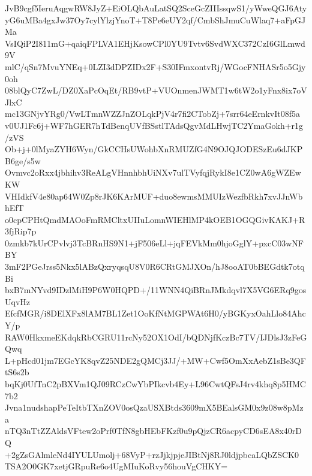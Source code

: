 JvB9cgf5IeruAqgwRW8JyZ+EiOLQbAuLatSQ2SceGcZIIIssqwS1/yWweQGJ6Aty
yG6uMBa4gxJw37Oy7cylYlzjYnoT+T8Pe6eUY2qf/CmbShJmuCuWlaq7+aFpGJMa
VsIQiP2I811mG+qaiqFPLVA1EHjKsowCPl0YU9Tvtv6SvdWXC372CzI6GlLmwd9V
mlC/qSn7MvuYNEq+0LZI3dDPZIDx2F+S30IFmxontvRj/WGocFNHASr5o5Gjy0oh
08blQyC7ZwL/DZ0XaPcOqEt/RB9vtP+VUOnmenJWMT1w6tW2o1yFnx8ix7oVJlxC
mc13GNjvYRg0/VwLTmnWZZJnZOLqkPjV4r7fi2CTobZj+7srr64eErnkvIt08f5a
v0UJ1Fc6j+WF7hGER7hTdBenqUVfBSstlTAdsQgvMdLHwjTC2YmaGokh+r1g/zVS
Ob+j+0lMyaZYH6Wyn/GkCCHsUWohbXnRMUZfG4N9OJQJODESzEu6dJKPB6ge/s5w
Ovmvc2oRxx4jbhihv3ReALgVHnnhbhUiNXv7ulTVyfqjRykI8e1CZ0wA6gWZEwKW
VHIdkfV4e80ap64W0Zp8rJK6KArMUF+duo8ewmsMMUIzWezfbRkh7xvJJnWbhEfT
o0cpCPHtQmdMAOoFmRMCltxUIIuLomnWIEHlMP4kOEB1OGQGivKAKJ+R3fjRip7p
0zmkb7kUrCPvlvj3TcBRnHS9N1+jF506eLl+jqFEVkMm0hjoGglY+pxcC03wNFBY
3mF2PGeJrss5Nkx5lABzQxryqsqU8V0R6CRtGMJXOn/hJ8ooAT0bBEGdtk7otqBi
bxB7mNYvd9IDzlMiH9P6W0HQPD+/11WNN4QiBRnJMkdqvl7X5VG6ERq9gosUqvHz
EfcfMGR/i8DElXFx8lAM7BL1Zet1OoKfNtMGPWAt6H0/yBGKyxOahLlo84AhcY/p
RAW0HkxmeEKdqkRbCGRU11rcNy52OX1OdI/bQDNjfKczBc7TV/IJDlsJ3zFeGQwq
L+pHcd01jm7EGcYK8qvZ25NDE2gQMCj3JJ/+MW+Cwf5OmXxAebZ1sBe3QFtS6s2b
bqKj0UfTnC2pBXVm1QJ09RCzCwYbPIkcvb4Ey+L96CwtQFsJ4rv4khq8p5HMC7b2
Jvna1nudshapPeTeItbTXnZOV0osQzaUSXBtds3609mX5BEalsGM0x9z08w8pMza
nTQ3nTtZZAldsVFtew2oPrf0TfN8gbHEbFKzf0u9pQjzCR6acpyCD6sEA8x40rDQ
+2gZsGAlmleNd4IYULUmolj+68VyP+rzJjkjpjeJIBtNj8RJ0ldjpbcaLQbZSCK0
TSA2O0GK7xetjGRpuRe6o4UgMIuKoRvy56houVgCHKY=
